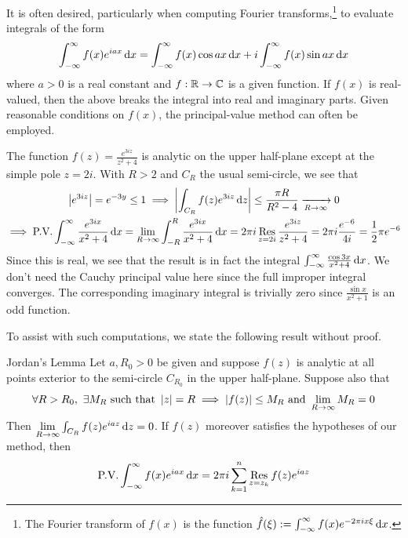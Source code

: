 \goodbreak



It is often desired, particularly when computing Fourier transforms,\footnote{%
	The Fourier transform of $f(x)$ is the function $\hat f(\xi):=\int_{-\infty}^\infty f(x)e^{-2\pi ix\xi}\,{\mathrm{d} x}$.%
} to evaluate integrals of the form
\[
	\int_{-\infty}^\infty f(x)e^{i ax}\,{\mathrm{d} x}
	=\int_{-\infty}^\infty f(x)\cos ax\,{\mathrm{d} x}
	+i\int_{-\infty}^\infty f(x)\sin ax\,{\mathrm{d} x}
\]
where $a>0$ is a real constant and $f:\mathbb{R}\to\mathbb{C}$ is a given function. If $f(x)$ is real-valued, then the above breaks the integral into real and imaginary parts. Given reasonable conditions on $f(x)$, the principal-value method can often be employed.

\begin{example}{}{}
	The function $f(z)=\frac{e^{3iz}}{z^2+4}$ is analytic on the upper half-plane except at the simple pole $z=2i$. With $R>2$ and $C_R$ the usual semi-circle, we see that
	\begin{gather*}
		\left| e^{3iz}\right|=e^{-3y}\le 1
		\implies \left| \int_{C_R}f(z)e^{3iz}\,{\mathrm{d} z}\right|
		\le \frac{\pi R}{R^2-4}\xrightarrow[R\to\infty]{} 0\\
		\implies \text{P.V.}\int_{-\infty}^\infty \frac{e^{3ix}}{x^2+4}\,{\mathrm{d} x} 
		=\lim_{R\to\infty}\int_{-R}^R \frac{e^{3ix}}{x^2+4}\,{\mathrm{d} x} 
		=2\pi i\operatorname*{Res}_{z=2i}\frac{e^{3iz}}{z^2+4} 
		=2\pi i\frac{e^{-6}}{4i} 
		=\frac 12\pi e^{-6}
	\end{gather*}
	Since this is real, we see that the result is in fact the integral $\int_{-\infty}^\infty \frac{\cos 3x}{x^2+4}\,{\mathrm{d} x}$. We don't need the Cauchy principal value here since the full improper integral converges. The corresponding imaginary integral is trivially zero since $\frac{\sin x}{x^2+1}$ is an odd function.
\end{example}

To assist with such computations, we state the following result without proof.

\begin{thm}{Jordan's Lemma}{}
	Let $a,R_0>0$ be given and suppose $f(z)$ is analytic at all points exterior to the semi-circle $C_{R_0}$ in the upper half-plane. Suppose also that
	\[
		\forall R>R_0,\ \exists M_R\text{ such that } \left| z\right|=R\implies \left| f(z)\right|\le M_R\text{ and }\lim_{R\to\infty}M_R=0
	\]
	Then $\lim\limits_{R\to\infty}\int_{C_R}f(z)e^{i az}\,{\mathrm{d} z}=0$. If $f(z)$ moreover satisfies the hypotheses of our method, then
	\[
		\text{P.V.}\int_{-\infty}^\infty f(x)e^{i ax}\,{\mathrm{d} x}
		=2\pi i\sum_{k=1}^n\operatorname*{Res}_{z=z_k}f(z)e^{i az}
	\]
\end{thm}


